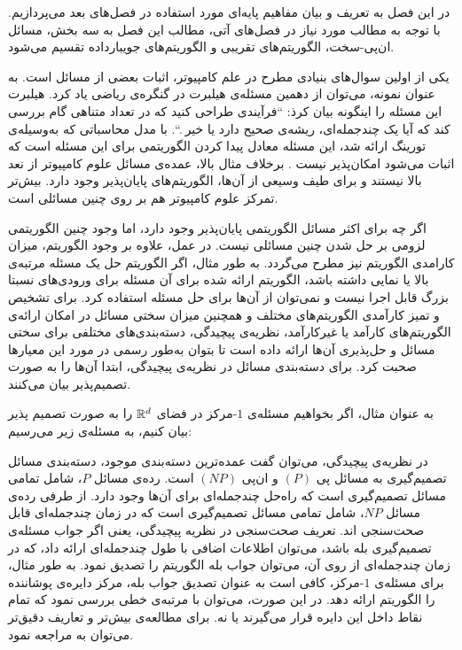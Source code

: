 

در این فصل به تعریف و بیان مفاهیم پایه‌ا‌ی مورد استفاده در فصل‌های بعد می‌پردازیم. با توجه به مطالب مورد نیاز در فصل‌های آتی، مطالب این فصل به سه بخش، مسائل ان‌پی-سخت، الگوریتم‌های تقریبی و الگوریتم‌های جویبارداده تقسیم می‌شود.

یکی از اولین سوال‌های بنیادی مطرح در علم کامپیوتر، اثبات  بعضی از مسائل است. به عنوان نمونه، می‌توان از دهمین مسئله‌ی هیلبرت در گنگره‌ی ریاضی یاد کرد. هیلبرت این مسئله را اینگونه بیان کرذ:‌ ``فرآیندی طراحی کنید که در تعداد متناهی گام بررسی کند که آیا یک چندجمله‌ای، ریشه‌ی صحیح دارد یا خیر .``. با مدل محاسباتی که به‌وسیله‌ی تورینگ ارائه‌ شد، این مسئله معادل پیدا کردن الگوریتمی برای این مسئله است که اثبات می‌شود امکان‌پذیر نیست . برخلاف مثال بالا، عمده‌ی مسائل علوم کامپیوتر از نعد بالا نیستند و برای طیف وسیعی از آن‌ها، الگوریتم‌های پایان‌پذیر وجود دارد. بیش‌تر تمرکز علوم کامپیوتر هم بر روی چنین مسائلی است.

اگر چه برای اکثر مسائل الگوریتمی پایان‌پذیر وجود دارد، اما وجود چنین الگوریتمی لزومی بر حل شدن چنین مسائلی نیست. در عمل، علاوه بر وجود الگوریتم، میزان کارامدی الگوریتم نیز مطرح می‌گردد. به طور مثال، اگر الگوریتم حل یک مسئله مرتبه‌ی بالا یا نمایی داشته باشد، الگوریتم ارائه شده برای آن مسئله برای ورودی‌های نسبتا بزرگ قابل اجرا نیست و نمی‌توان از آن‌ها برای حل مسئله استفاده کرد. برای تشخیص و تمیز کارآمدی الگوریتم‌های مختلف و همچنین میزان سختی مسائل در امکان ارائه‌ی الگوریتم‌های کارآمد یا غیرکارآمد، نظریه‌ی پیچیدگی، دسته‌بندی‌های مختلفی برای سختی مسائل و حل‌پذیری آن‌ها ارائه داده است تا بتوان به‌طور رسمی در مورد این معیار‌ها صحبت کرد. برای دسته‌بندی مسائل در نظریه‌ی پیچیدگی، ابتدا آن‌ها را به صورت تصمیم‌پذیر بیان می‌کنند.


به عنوان مثال، اگر بخواهیم مسئله‌ی $1$-مرکز در فضای $\mathbb{R}^d$ را به صورت تصمیم پذیر بیان کنیم، به مسئله‌ی زیر می‌رسیم:


در نظریه‌ی پیچیدگی، می‌توان گفت عمده‌ترین دسته‌بندی موجود، دسته‌بندی مسائل تصمیم‌گیری به مسائل پی $(P)$ و  ان‌پی $(NP)$ است. رده‌ی مسائل $P$، شامل تمامی مسائل تصمیم‌گیری است که راه‌حل چندجمله‌ای برای آن‌ها وجود دارد. از طرفی رده‌ی مسائل $NP$، شامل تمامی مسائل تصمیم‌گیری است که در زمان چندجمله‌ای قابل صحت‌سنجی اند. تعریف صحت‌سنجی در نظریه پیچیدگی، یعنی اگر جواب مسئله‌ی تصمیم‌گیری بله باشد، می‌توان اطلاعات اضافی با طول چندجمله‌ای ارائه داد، که در زمان چند‌جمله‌ای از روی آن، می‌توان جواب بله الگوریتم را تصدیق نمود. به طور مثال، برای مسئله‌ی $1$-مرکز، کافی است به عنوان تصدیق جواب بله، مرکز دایره‌ی پوشاننده را الگوریتم ارائه دهد. در این صورت، می‌توان با مرتبه‌ی خطی بررسی نمود که تمام نقاط داخل این دایره قرار می‌گیرند یا نه. برای مطالعه‌ی بیش‌تر و تعاریف دقیق‌تر می‌توان به  مراجعه نمود.

